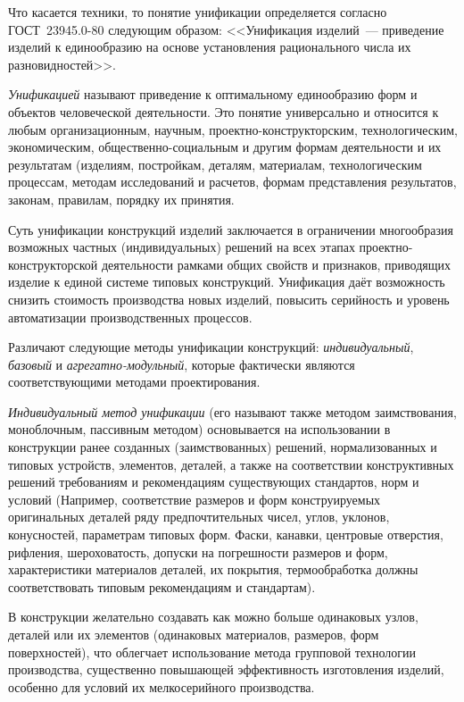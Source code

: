\begin{enumerate}
Что касается техники, то понятие унификации определяется согласно ГОСТ~23945.0-80 следующим образом: <<Унификация изделий~--- приведение изделий к единообразию на основе установления рационального числа их разновидностей>>.

\textit{Унификацией} называют приведение к оптимальному единообразию форм и объектов человеческой деятельности. Это понятие универсально и относится к любым организационным, научным, проектно-конструкторским, технологическим, экономическим, общественно-социальным и другим формам деятельности и их результатам (изделиям, постройкам, деталям, материалам, технологическим процессам, методам исследований и расчетов, формам представления результатов, законам, правилам, порядку их принятия.

Суть унификации конструкций изделий заключается в ограничении многообразия возможных частных (индивидуальных) решений на всех этапах проектно-конструкторской деятельности рамками общих свойств и признаков, приводящих изделие к единой системе типовых конструкций.
Унификация даёт возможность снизить стоимость производства новых изделий, повысить серийность и уровень автоматизации производственных процессов.

Различают следующие методы унификации конструкций: \textit{индивидуальный}, \textit{базовый} и \textit{агрегатно-модульный}, которые фактически являются соответствующими методами проектирования.

\textit{Индивидуальный метод унификации} (его называют также методом заимствования, моноблочным, пассивным методом) основывается на использовании в конструкции ранее созданных (заимствованных) решений, нормализованных и типовых устройств, элементов, деталей, а также на соответствии конструктивных решений требованиям и рекомендациям существующих стандартов, норм и условий (Например, соответствие размеров и форм конструируемых оригинальных деталей ряду предпочтительных чисел, углов, уклонов, конусностей, параметрам типовых форм. Фаски, канавки, центровые отверстия, рифления, шероховатость, допуски на погрешности размеров и форм, характеристики материалов деталей, их покрытия, термообработка должны соответствовать типовым рекомендациям и стандартам).

В конструкции желательно создавать как можно больше одинаковых узлов, деталей или их элементов (одинаковых материалов, размеров, форм поверхностей), что облегчает использование метода групповой технологии производства, существенно повышающей эффективность изготовления изделий, особенно для условий их мелкосерийного производства.


\end{enumerate}

